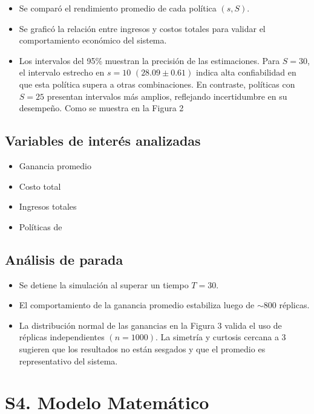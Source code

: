 \documentclass{report}
\begin{document}
\begin{itemize}
\item Se comparó el rendimiento promedio de cada política \((s, S)\).
\item Se graficó la relación entre ingresos y costos totales para validar el comportamiento 
económico del sistema.
\item Los intervalos del 95\% muestran la precisión de las estimaciones. Para \(S=30\), 
el intervalo estrecho en \(s=10\) \((28.09 \pm 0.61)\) indica alta confiabilidad en que esta 
política supera a otras combinaciones. En contraste, políticas con \(S=25\) presentan intervalos 
más amplios, reflejando incertidumbre en su desempeño. Como se muestra en la Figura 2
\end{itemize}

\subsection*{Variables de interés analizadas}

\begin{itemize}
\item Ganancia promedio
\item Costo total
\item Ingresos totales
\item Políticas de 
\end{itemize}

\subsection*{Análisis de parada}

\begin{itemize}
\item Se detiene la simulación al superar un tiempo \(T = 30\).
\item El comportamiento de la ganancia promedio estabiliza luego de $\sim$800 réplicas.
\item La distribución normal de las ganancias en la Figura 3 valida el uso de réplicas independientes 
\((n=1000)\). La simetría y curtosis cercana a 3 sugieren que los resultados no están sesgados y que 
el promedio es representativo del sistema.
\end{itemize}


\section*{S4. Modelo Matemático}
\end{document}
